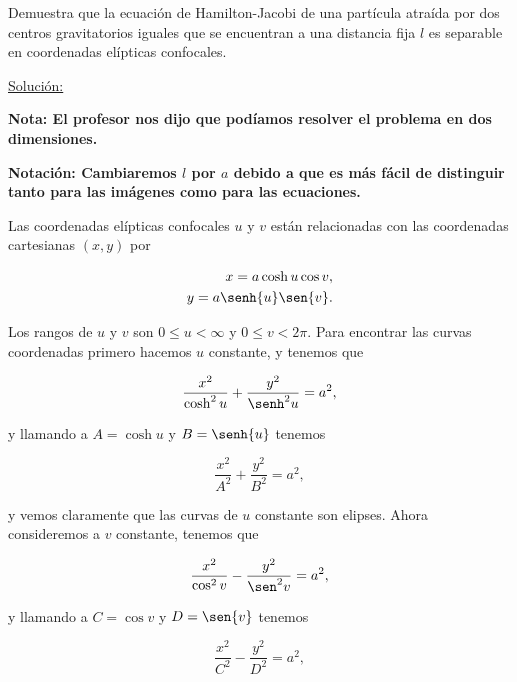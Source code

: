 \documentclass[a4paper,10pt]{article}
\numberwithin{equation}{section}
\begin{document}
Demuestra que la ecuación de Hamilton-Jacobi de una partícula atraída por dos centros
gravitatorios iguales que se encuentran a una distancia fija $l$ es separable en coordenadas 
elípticas confocales. 

\vspace{.3cm}

\underline{Solución:} \vspace{.3cm}

\textbf{Nota: El profesor nos dijo que podíamos resolver el problema en dos dimensiones.}

\vspace{.3cm}

\textbf{Notación: Cambiaremos $l$ por $a$ debido a que es más fácil de distinguir tanto 
para las imágenes como para las ecuaciones.}

\vspace{.3cm}

Las coordenadas elípticas confocales $u$ y $v$ están relacionadas con las coordenadas 
cartesianas $(x,y)$ por 

\begin{align}
 x = a\cosh{u}\cos{v}, \\
 y = a\senh{u}\sen{v}.
\end{align}

Los rangos de $u$ y $v$ son $0 \leq u < \infty$ y $0 \leq v < 2\pi$. Para encontrar
las curvas coordenadas primero hacemos $u$ constante, y tenemos que 

\begin{equation}
 \frac{x^2}{\cosh^2{u}} + \frac{y^2}{\senh^2{u}} = a^2,
 \label{eq:uelipse}
\end{equation}

y llamando a $A = \cosh{u}$ y $B = \senh{u}$ tenemos 

\begin{equation}
 \frac{x^2}{A^2} + \frac{y^2}{B^2} = a^2,
\end{equation}

y vemos claramente que las curvas de $u$ constante son elipses. Ahora consideremos 
a $v$ constante, tenemos que 

\begin{equation}
 \frac{x^2}{\cos^2{v}} - \frac{y^2}{\sen^2{v}} = a^2,
 \label{eq:vhiperbola}
\end{equation}

y llamando a $C = \cos{v}$ y $D = \sen{v}$ tenemos 

\begin{equation}
 \frac{x^2}{C^2} - \frac{y^2}{D^2} = a^2,
\end{equation}
\end{document}
